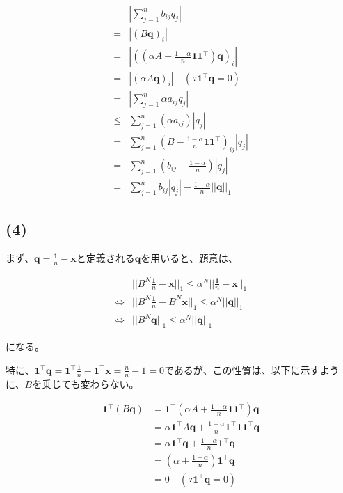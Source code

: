 \documentclass[a4paper, 10pt, dvipdfmx]{jlreq}
\begin{document}
\begin{align*}
         & \left|\sum_{j=1}^n b_{ij}q_j\right|                                               \\
  =   {} & |(B\bm{q})_i|                                                                     \\
  =   {} & \left|\left((\alpha A+\frac{1-\alpha}{n}\bm{1}\bm{1}^\top )\bm{q}\right)_i\right| \\
  =   {} & \left|(\alpha A\bm{q})_i\right| \quad (\because \bm{1}^\top \bm{q}=0)             \\
  =   {} & \left|\sum_{j=1}^n\alpha a_{ij}q_j\right|                                         \\
  \leq{} & \sum_{j=1}^n(\alpha a_{ij})|q_j|                                                  \\
  =   {} & \sum_{j=1}^n \left(B-\frac{1-\alpha}{n}\bm{1}\bm{1}^\top \right)_{ij}|q_j|        \\
  =   {} & \sum_{j=1}^n \left(b_{ij}-\frac{1-\alpha}{n}\right)|q_j|                          \\
  =   {} & \sum_{j=1}^n b_{ij}|q_j|-\frac{1-\alpha}{n}||\bm{q}||_1
\end{align*}

\subsection*{(4)}

まず、$\bm{q}=\frac{\bm{1}}{n}-\bm{x}$と定義される$\bm{q}$を用いると、題意は、

\begin{align*}
                  & ||B^N\frac{\bm{1}}{n}-\bm{x}||_1 \leq \alpha^N ||\frac{\bm{1}}{n}-\bm{x}||_1 \\
  \Leftrightarrow & ||B^N\frac{\bm{1}}{n}-B^N\bm{x}||_1 \leq \alpha^N ||\bm{q}||_1               \\
  \Leftrightarrow & ||B^N\bm{q}||_1 \leq \alpha^N ||\bm{q}||_1
\end{align*}

になる。

特に、$\bm{1}^\top \bm{q}=\bm{1}^\top \frac{\bm{1}}{n}-\bm{1}^\top \bm{x}=\frac{n}{n}-1=0$であるが、この性質は、以下に示すように、$B$を乗じても変わらない。

\begin{align*}
  \bm{1}^\top (B\bm{q}) & =\bm{1}^\top  \left(\alpha A+\frac{1-\alpha}{n}\bm{1}\bm{1}^\top \right)\bm{q}     \\
                        & =\alpha \bm{1}^\top A\bm{q}+\frac{1-\alpha}{n}\bm{1}^\top \bm{1}\bm{1}^\top \bm{q} \\
                        & =\alpha \bm{1}^\top \bm{q}+\frac{1-\alpha}{n}\bm{1}^\top \bm{q}                    \\
                        & =\left(\alpha+\frac{1-\alpha}{n}\right)\bm{1}^\top \bm{q}                          \\
                        & =0 \quad (\because \bm{1}^\top \bm{q}=0)
\end{align*}
\end{document}

